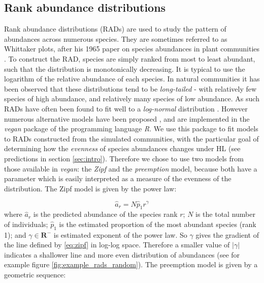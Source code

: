 \subsection{Rank abundance distributions}
\label{sec:define_rads}

Rank abundance distributions (RADs) are used to study the pattern of abundances across numerous species. They are sometimes referred to as Whittaker plots, after his 1965 paper on species abundances in plant communities \cite{whittaker1965dominance}. To construct the RAD, species are simply ranked from most to least abundant, such that the distribution is monotonically decreasing. It is typical to use the logarithm of the relative abundance of each species. In natural communities it has been observed that these distributions tend to be \emph{long-tailed} - with relatively few species of high abundance, and relatively many species of low abundance. As such RADs have often been found to fit well to a \emph{log-normal} distribution \cite{lurgi2015effects,whittaker1965dominance}. However numerous alternative models have been proposed \cite{wilson1991methods}, and are implemented in the \emph{vegan} package \cite{oksanen2007vegan} of the programming language \emph{R}. We use this package to fit models to RADs constructed from the simulated communities, with the particular goal of determining how the \emph{evenness} of species abundances changes under HL (see predictions in section \ref{sec:intro}). Therefore we chose to use two models from those available in \emph{vegan}: the \emph{Zipf} and the \emph{preemption} model, because both have a parameter which is easily interpreted as a measure of the evenness of the distribution. The Zipf model is given by the power law: 

\begin{equation}
\hat{a}_r = N\hat{p}_1r^{\gamma}
\label{eq:zipf}
\end{equation}
%
where $\hat{a}_r$ is the predicted abundance of the species rank $r$; $N$ is the total number of individuals; $\hat{p}_1$ is the estimated proportion of the most abundant species (rank 1); and $\gamma \in \mathbf{R}^-$ is estimated exponent of the power law. So $\gamma$ gives the gradient of the line defined by \eqref{eq:zipf} in log-log space. Therefore a smaller value of $\left| \gamma \right|$ indicates a shallower line and more even distribution of abundances (see for example figure \ref{fig:example_rads_random}). The preemption model is given by a geometric sequence:

